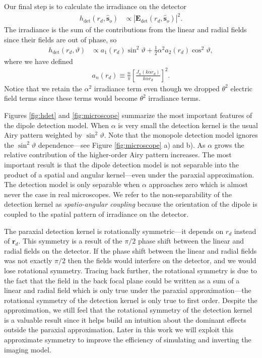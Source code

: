 \documentclass{osa-article}
\providecommand{\mb}[1]{\mathbf{#1}}
\providecommand{\so}{\mathbf{\hat{s}}_o}
\providecommand{\rd}{\mathbf{r}_d}
\begin{document}
Our final step is to calculate the irradiance on the detector
\begin{align}
  h_{\text{det}}(r_d, \so{}) &\propto |\mb{E}_{\text{det}}(r_d, \so{})|^2.
\end{align}
The irradiance is the sum of the contributions from the linear and radial fields
since their fields are out of phase, so
\begin{align}
  h_{\text{det}}(r_d, \vartheta) &\propto a_1(r_d)\sin^2\vartheta + \frac{1}{2}\alpha^2 a_2(r_d)\cos^2\vartheta, 
\end{align}
where we have defined
\begin{align}
  a_n(r_d) \equiv \frac{n}{\pi}\left[\frac{J_n(k\alpha r_d)}{k\alpha r_d}\right]^2. 
\end{align}
Notice that we retain the $\alpha^2$ irradiance term even though we dropped
$\theta^2$ electric field terms since these terms would become $\theta^2$
irradiance terms.

Figures \ref{fig:hdet} and \ref{fig:microscope} summarize the most important
features of the dipole detection model. When $\alpha$ is very small the
detection kernel is the usual Airy pattern weighted by $\sin^2\vartheta$. Note
that the monopole detection model ignores the $\sin^2\vartheta$ dependence---see
Figure \ref{fig:microscope} a) and b). As $\alpha$ grows the relative
contribution of the higher-order Airy pattern increases. The most important
result is that the dipole detection model is not separable into the product of
a spatial and angular kernel---even under the paraxial approximation. The detection
model is only separable when $\alpha$ approaches zero which is almost never the
case in real microscopes. We refer to the non-separability of the detection
kernel as \textit{spatio-angular coupling} because the orientation of the dipole
is coupled to the spatial pattern of irradiance on the detector.

The paraxial detection kernel is rotationally symmetric---it depends on $r_d$ instead of
$\rd$. This symmetry is a result of the $\pi/2$ phase shift between the linear
and radial fields on the detector. If the phase shift between the linear and
radial fields was not exactly $\pi/2$ then the fields would interfere on the
detector, and we would lose rotational symmetry. Tracing back further, the
rotational symmetry is due to the fact that the field in the back focal plane
could be written as a sum of a linear and radial field which is only true under
the paraxial approximation---the rotational symmetry of the detection kernel is
only true to first order. Despite the approximation, we still feel that the
rotational symmetry of the detection kernel is a valuable result since it helps
build an intuition about the dominant effects outside the paraxial
approximation. Later in this work we will exploit this approximate symmetry to
improve the efficiency of simulating and inverting the imaging model. 
\end{document}
